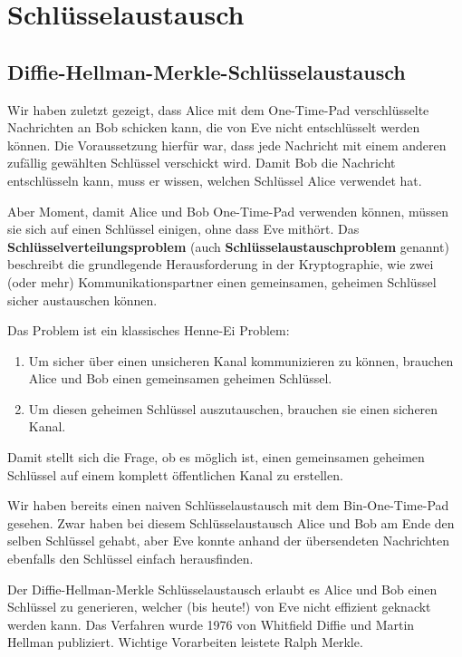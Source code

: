 \chapter{Schlüsselaustausch}\label{ch:03}

\lstset{style=Python}

\section{Diffie-Hellman-Merkle-Schlüsselaustausch}\label{sec:Diffie-Hellman-Merkle}
Wir haben zuletzt gezeigt, dass Alice mit dem One-Time-Pad verschlüsselte Nachrichten an Bob schicken kann, die von Eve nicht entschlüsselt werden können. Die Voraussetzung hierfür war, dass jede Nachricht mit einem anderen zufällig gewählten Schlüssel verschickt wird. Damit Bob die Nachricht entschlüsseln kann, muss er wissen, welchen Schlüssel Alice verwendet hat. 

Aber Moment, damit Alice und Bob One-Time-Pad verwenden können, müssen sie sich auf einen Schlüssel einigen, ohne dass Eve mithört. Das \textbf{Schlüsselverteilungsproblem} (auch \textbf{Schlüsselaustauschproblem} genannt) beschreibt die grundlegende Herausforderung in der Kryptographie, wie zwei (oder mehr) Kommunikationspartner einen gemeinsamen, geheimen Schlüssel sicher austauschen können.

Das Problem ist ein klassisches Henne-Ei Problem:
\begin{enumerate}
	\item Um sicher über einen unsicheren Kanal kommunizieren zu können, brauchen Alice und Bob einen gemeinsamen geheimen Schlüssel.
	\item Um diesen geheimen Schlüssel auszutauschen, brauchen sie einen sicheren Kanal.
\end{enumerate}

Damit stellt sich die Frage, ob es möglich ist, einen gemeinsamen geheimen Schlüssel auf einem komplett öffentlichen Kanal zu erstellen.

Wir haben bereits einen naiven Schlüsselaustausch mit dem Bin-One-Time-Pad gesehen. Zwar haben bei diesem Schlüsselaustausch Alice und Bob am Ende den selben Schlüssel gehabt, aber Eve konnte anhand der übersendeten Nachrichten ebenfalls den Schlüssel einfach herausfinden. 

Der Diffie-Hellman-Merkle Schlüsselaustausch erlaubt es Alice und Bob einen Schlüssel zu generieren, welcher (bis heute!) von Eve nicht effizient geknackt werden kann. Das Verfahren wurde 1976 von Whitfield Diffie und Martin Hellman publiziert. Wichtige Vorarbeiten leistete Ralph Merkle. 

